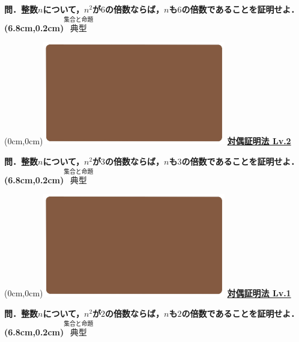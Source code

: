 \documentclass[10pt,
fleqn,
dvipdfmx,
uplatex
]{jsarticle}
\begin{document}
\LARGE 
\bf\boldmath 問．整数$n$について，$n^2$が$6$の倍数ならば，$n$も$6$の倍数であることを証明せよ．
\at(6.8cm,0.2cm){\small\color{bradorange}$\overset{\text{集合と命題}}{\text{典型}}$}


\newpage



\at(0cm,0cm){\includegraphics[width=8cm,bb=0 0 1920 1080]{./youtube/thumbnails/templates/smart_background/集合と命題.jpeg}}
{\color{orange}\bf\boldmath\huge\underline{対偶証明法 Lv.2 }}\vspace{0.3zw}

\LARGE 
\bf\boldmath 問．整数$n$について，$n^2$が$3$の倍数ならば，$n$も$3$の倍数であることを証明せよ．
\at(6.8cm,0.2cm){\small\color{bradorange}$\overset{\text{集合と命題}}{\text{典型}}$}


\newpage



\at(0cm,0cm){\includegraphics[width=8cm,bb=0 0 1920 1080]{./youtube/thumbnails/templates/smart_background/集合と命題.jpeg}}
{\color{orange}\bf\boldmath\huge\underline{対偶証明法 Lv.1 }}\vspace{0.3zw}

\LARGE 
\bf\boldmath 問．整数$n$について，$n^2$が$2$の倍数ならば，$n$も$2$の倍数であることを証明せよ．
\at(6.8cm,0.2cm){\small\color{bradorange}$\overset{\text{集合と命題}}{\text{典型}}$}
\end{document}
